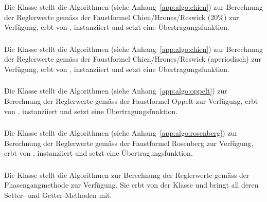 \subsubsection*{}
Die     Klasse          stellt    die     Algorithmen     (siehe
Anhang~\ref{app:algo:chien})   zur   Berechnung   der   Reglerwerte   gem\"ass
der  Faustformel   Chien/Hrones/Reswick  (20\%)  zur  Verf\"ugung,   erbt  von
, instanziiert und setzt eine \"Ubertragungsfunktion.


\subsubsection*{}
Die    Klasse         stellt    die     Algorithmen    (siehe
Anhang~\ref{app:algo:chien})  zur  Berechnung  der  Reglerwerte  gem\"ass  der
Faustformel  Chien/Hrones/Reswick  (aperiodisch)  zur  Verf\"ugung,  erbt  von
, instanziiert und setzt eine \"Ubertragungsfunktion.


\subsubsection*{}
Die     Klasse          stellt     die     Algorithmen     (siehe
Anhang~\ref{app:algo:oppelt})  zur  Berechnung  der Reglerwerte  gem\"ass  der
Faustformel Oppelt  zur Verf\"ugung, erbt von  , instanziiert
und setzt eine \"Ubertragungsfunktion.


\subsubsection*{}
Die     Klasse         stellt    die     Algorithmen    (siehe
Anhang~\ref{app:algo:rosenberg})  zur  Berechnung   der  Reglerwerte  gem\"ass
der  Faustformel  Rosenberg  zur   Verf\"ugung,  erbt  von  ,
instanziiert und setzt eine \"Ubertragungsfunktion.


\subsubsection*{}
Die Klasse   stellt  die Algorithmen  zur Berechnung
der Reglerwerte  gem\"ass der Phasengangmethode zur  Verf\"ugung. Sie erbt von
der Klasse  und bringt  all deren Setter- und Getter-Methoden
mit.

